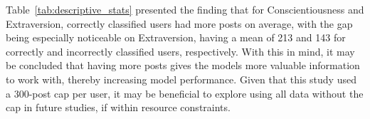 Table~\ref{tab:descriptive_stats} presented the finding that for Conscientiousness and Extraversion, correctly classified users had more posts on average, with the gap being especially noticeable on Extraversion, having a mean of 213 and 143 for correctly and incorrectly classified users, respectively. With this in mind, it may be concluded that having more posts gives the models more valuable information to work with, thereby increasing model performance. Given that this study used a 300-post cap per user, it may be beneficial to explore using all data without the cap in future studies, if within resource constraints.

